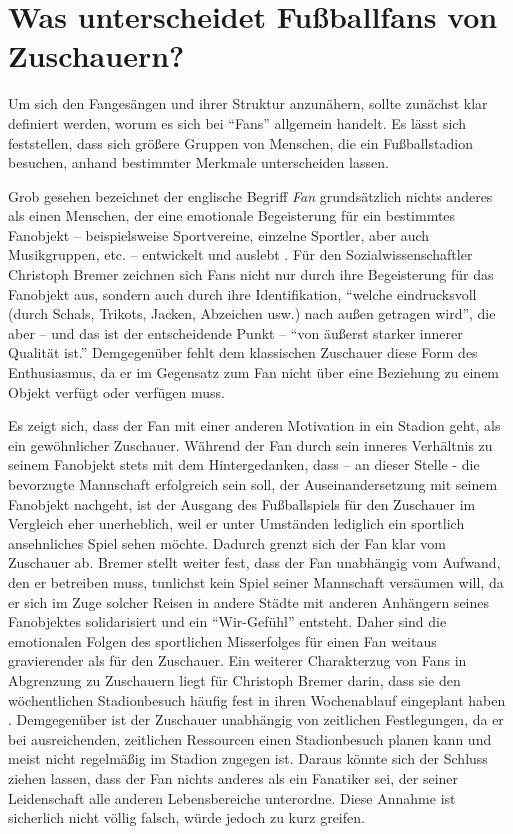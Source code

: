 \section{Was unterscheidet Fußballfans von Zuschauern?}
Um sich den Fangesängen und ihrer Struktur anzunähern, sollte zunächst klar definiert werden, worum es sich bei "`Fans"' allgemein handelt.
Es lässt sich feststellen, dass sich größere Gruppen von Menschen, die ein Fußballstadion besuchen, anhand bestimmter Merkmale unterscheiden lassen.

Grob gesehen bezeichnet der englische Begriff \emph{Fan} grundsätzlich nichts anderes als einen Menschen, der eine emotionale Begeisterung für ein bestimmtes Fanobjekt – beispielsweise
Sportvereine, einzelne Sportler, aber auch Musikgruppen, etc. – entwickelt und auslebt \cite{Dud14}.
Für den Sozialwissenschaftler Christoph Bremer zeichnen sich Fans nicht nur durch ihre Begeisterung für das Fanobjekt aus, sondern auch durch ihre Identifikation, "`welche eindrucksvoll (durch Schals, Trikots, Jacken, Abzeichen usw.) nach außen getragen wird"', die aber – und das ist der entscheidende Punkt – "`von äußerst starker innerer Qualität ist."' \cite[S. 57]{CB03}
Demgegenüber fehlt dem klassischen Zuschauer diese Form des Enthusiasmus, da er im Gegensatz zum Fan nicht über eine Beziehung zu einem Objekt verfügt oder verfügen muss.

Es zeigt sich, dass der Fan mit einer anderen Motivation in ein Stadion geht, als ein gewöhnlicher Zuschauer.
Während der Fan durch sein inneres Verhältnis zu seinem Fanobjekt stets mit dem Hintergedanken, dass – an dieser Stelle - die bevorzugte Mannschaft erfolgreich sein soll, der Auseinandersetzung mit seinem Fanobjekt nachgeht, ist der Ausgang des Fußballspiels für den Zuschauer im Vergleich eher unerheblich, weil er unter Umständen lediglich ein sportlich ansehnliches Spiel sehen möchte.
Dadurch grenzt sich der Fan klar vom Zuschauer ab.
Bremer stellt weiter fest, dass der Fan unabhängig vom Aufwand, den er betreiben muss, tunlichst kein Spiel seiner Mannschaft versäumen will, da er sich im Zuge solcher Reisen in andere Städte mit anderen Anhängern seines Fanobjektes solidarisiert und ein "`Wir-Gefühl"' entsteht.
Daher sind die emotionalen Folgen des sportlichen Misserfolges für einen Fan weitaus gravierender als für den Zuschauer.
Ein weiterer Charakterzug von Fans in Abgrenzung zu Zuschauern liegt für Christoph Bremer darin, dass sie den wöchentlichen Stadionbesuch häufig fest in ihren Wochenablauf eingeplant haben \cite[S. 58]{CB03}.
Demgegenüber ist der Zuschauer unabhängig von zeitlichen Festlegungen, da er bei ausreichenden, zeitlichen Ressourcen einen Stadionbesuch planen kann und meist nicht regelmäßig im Stadion zugegen ist.
Daraus könnte sich der Schluss ziehen lassen, dass der Fan nichts anderes als ein Fanatiker sei, der seiner Leidenschaft alle anderen Lebensbereiche unterordne.
Diese Annahme ist sicherlich nicht völlig falsch, würde jedoch zu kurz greifen.

